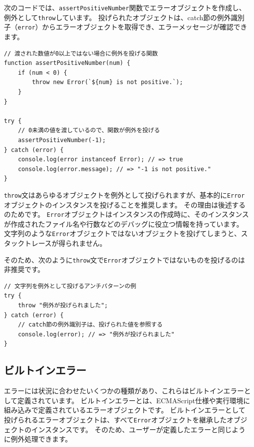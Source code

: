 次のコードでは、\texttt{assertPositiveNumber}関数でエラーオブジェクトを作成し、例外として\texttt{throw}しています。
投げられたオブジェクトは、catch節の例外識別子（\texttt{error}）からエラーオブジェクトを取得でき、エラーメッセージが確認できます。

\begin{lstlisting}
// 渡された数値が0以上ではない場合に例外を投げる関数
function assertPositiveNumber(num) {
    if (num < 0) {
        throw new Error(`${num} is not positive.`);
    }
}

try {
    // 0未満の値を渡しているので、関数が例外を投げる
    assertPositiveNumber(-1);
} catch (error) {
    console.log(error instanceof Error); // => true
    console.log(error.message); // => "-1 is not positive."
}
\end{lstlisting}

\texttt{throw}文はあらゆるオブジェクトを例外として投げられますが、基本的に\texttt{Error}オブジェクトのインスタンスを投げることを推奨します。
その理由は後述する\textbf{}のためです。
\texttt{Error}オブジェクトはインスタンスの作成時に、そのインスタンスが作成されたファイル名や行数などのデバッグに役立つ情報を持っています。
文字列のような\texttt{Error}オブジェクトではないオブジェクトを投げてしまうと、スタックトレースが得られません。

そのため、次のように\texttt{throw}文で\texttt{Error}オブジェクトではないものを投げるのは非推奨です。

\begin{lstlisting}
// 文字列を例外として投げるアンチパターンの例
try {
    throw "例外が投げられました";
} catch (error) {
    // catch節の例外識別子は、投げられた値を参照する
    console.log(error); // => "例外が投げられました"
}
\end{lstlisting}

\hypertarget{built-in-error}{%
\subsection{ビルトインエラー}\label{built-in-error}}

エラーには状況に合わせたいくつかの種類があり、これらはビルトインエラーとして定義されています。
ビルトインエラーとは、ECMAScript仕様や実行環境に組み込みで定義されているエラーオブジェクトです。
ビルトインエラーとして投げられるエラーオブジェクトは、すべて\texttt{Error}オブジェクトを継承したオブジェクトのインスタンスです。
そのため、ユーザーが定義したエラーと同じように例外処理できます。

